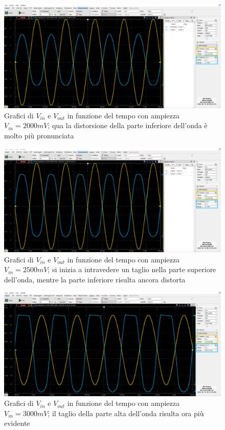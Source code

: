 \documentclass[10pt, a4paper, italian]{article}
\begin{document}
\begin{figure}[H]
    \centering
	\includegraphics[scale=0.4]{amp.2000}
    \caption{Grafici di $V_{in}$ e $V_{out}$ in funzione del tempo con ampiezza $V_{in}=2000 mV$; qua la distorsione della parte inferiore dell'onda è molto più pronunciata}
\end{figure}
\begin{figure}[H]
    \centering
	\includegraphics[scale=0.4]{amp.2500}
    \caption{Grafici di $V_{in}$ e $V_{out}$ in funzione del tempo con ampiezza $V_{in}=2500 mV$; si inizia a intravedere un taglio nella parte superiore dell'onda, mentre la parte inferiore risulta ancora distorta}
\end{figure}
\begin{figure}[H]
    \centering
	\includegraphics[scale=0.4]{amp.3000}
    \caption{Grafici di $V_{in}$ e $V_{out}$ in funzione del tempo con ampiezza $V_{in}=3000 mV$; il taglio della parte alta dell'onda risulta ora più evidente}
\end{figure}
\end{document}
